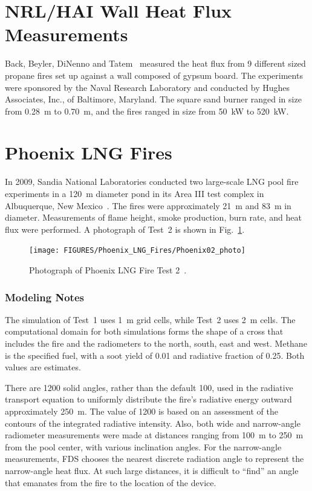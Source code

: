 \section{NRL/HAI Wall Heat Flux Measurements}
\label{NRL_HAI_Description}

Back, Beyler, DiNenno and Tatem~\cite{Back:IAFSS4} measured the heat flux from 9 different sized propane fires set up against a wall composed
of gypsum board. The experiments were sponsored by the Naval Research Laboratory and conducted by Hughes Associates, Inc., of Baltimore, Maryland. The
square sand burner ranged in size from 0.28~m to 0.70~m, and the fires ranged in size from 50~kW to 520~kW.


\section{Phoenix LNG Fires}
\label{Phoenix_LNG_Fires_Description}

In 2009, Sandia National Laboratories conducted two large-scale LNG pool fire experiments in a 120~m diameter pond in its Area III test complex in Albuquerque, New Mexico~\cite{Blanchat:2011}. The fires were approximately 21~m and 83~m in diameter. Measurements of flame height, smoke production, burn rate, and heat flux were performed. A photograph of Test~2 is shown in Fig.~\ref{Phoenix_Photo}.

\begin{figure}[p]
\texttt{[image: FIGURES/Phoenix\_LNG\_Fires/Phoenix02\_photo]}
\caption[Photograph of Phoenix LNG Fire Test 2]{Photograph of Phoenix LNG Fire Test 2~\cite{Blanchat:2011}.}
\label{Phoenix_Photo}
\end{figure}


\subsubsection{Modeling Notes}

The simulation of Test~1 uses 1~m grid cells, while Test~2 uses 2~m cells. The computational domain for both simulations forms the shape of a cross that includes the fire and the radiometers to the north, south, east and west. Methane is the specified fuel, with a soot yield of 0.01 and radiative fraction of 0.25. Both values are estimates.

There are 1200 solid angles, rather than the default 100, used in the radiative transport equation to uniformly distribute the fire's radiative energy outward approximately 250~m. The value of 1200 is based on an assessment of the contours of the integrated radiative intensity. Also, both wide and narrow-angle radiometer measurements were made at distances ranging from 100~m to 250~m from the pool center, with various inclination angles. For the narrow-angle measurements, FDS chooses the nearest discrete radiation angle to represent the narrow-angle heat flux. At such large distances, it is difficult to ``find'' an angle that emanates from the fire to the location of the device.

